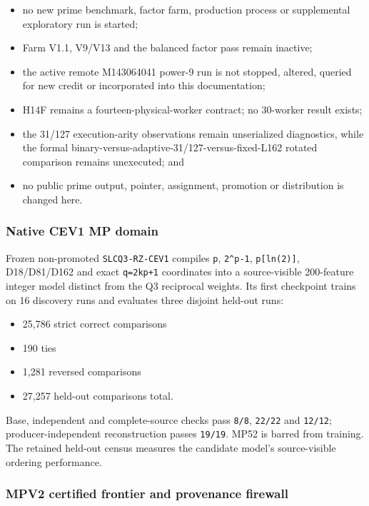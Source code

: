 \begin{itemize}
\tightlist
\item
  no new prime benchmark, factor farm, production process or
  supplemental exploratory run is started;
\item
  Farm V1.1, V9/V13 and the balanced factor pass remain inactive;
\item
  the active remote M143064041 power-9 run is not stopped, altered,
  queried for new credit or incorporated into this documentation;
\item
  H14F remains a fourteen-physical-worker contract; no 30-worker result
  exists;
\item
  the 31/127 execution-arity observations remain unserialized
  diagnostics, while the formal
  binary-versus-adaptive-31/127-versus-fixed-L162 rotated comparison
  remains unexecuted; and
\item
  no public prime output, pointer, assignment, promotion or distribution
  is changed here.
\end{itemize}

\subsubsection{Native CEV1 MP domain}\label{viii-ch10-native-cev1-mp-domain}

Frozen non-promoted \texttt{SLCQ3-RZ-CEV1} compiles \texttt{p},
\texttt{2\^{}p-1}, \texttt{p{[}ln(2){]}}, D18/D81/D162 and exact
\texttt{q=2kp+1} coordinates into a source-visible 200-feature integer
model distinct from the Q3 reciprocal weights. Its first checkpoint
trains on 16 discovery runs and evaluates three disjoint held-out runs:

\begin{itemize}
\tightlist
\item
  25,786 strict correct comparisons
\item
  190 ties
\item
  1,281 reversed comparisons
\item
  27,257 held-out comparisons total.
\end{itemize}

Base, independent and complete-source checks pass \texttt{8/8},
\texttt{22/22} and \texttt{12/12}; producer-independent reconstruction
passes \texttt{19/19}. MP52 is barred from training. The retained held-out census measures the candidate model's source-visible ordering performance.

\subsubsection{MPV2 certified frontier and provenance
firewall}\label{viii-ch10-mpv2-certified-frontier-and-provenance-firewall}

